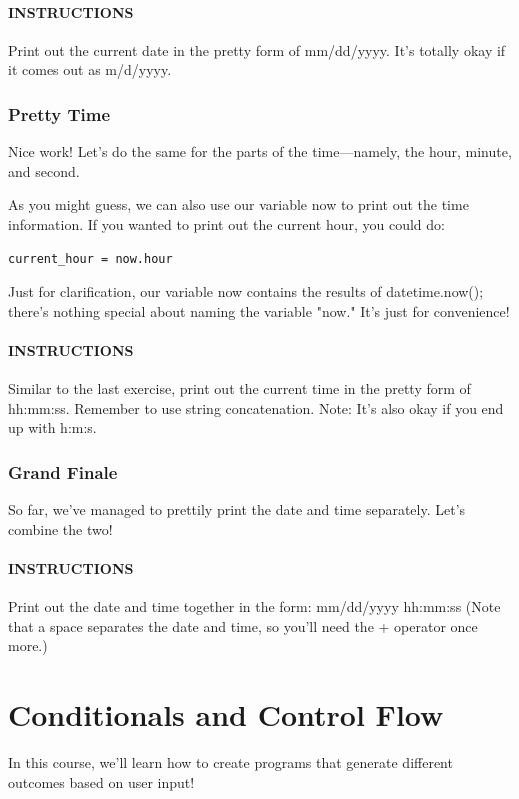 \documentclass[12pt,a4paper,final,twoside,onecolumn,titlepage]{book}
\begin{document}
\subsubsection{INSTRUCTIONS}
Print out the current date in the pretty form of mm/dd/yyyy. It's totally okay if it comes out as m/d/yyyy.

\subsection{Pretty Time}
Nice work! Let's do the same for the parts of the time—namely, the hour, minute, and second.

As you might guess, we can also use our variable now to print out the time information. If you wanted to print out the current hour, you could do:
\begin{lstlisting}
current_hour = now.hour
\end{lstlisting}
Just for clarification, our variable now contains the results of datetime.now(); there's nothing special about naming the variable "now." It's just for convenience!

\subsubsection{INSTRUCTIONS}
Similar to the last exercise, print out the current time in the pretty form of hh:mm:ss. Remember to use string concatenation.
Note: It's also okay if you end up with h:m:s.

\subsection{Grand Finale}
So far, we've managed to prettily print the date and time separately. Let's combine the two!

\subsubsection{INSTRUCTIONS}
Print out the date and time together in the form: mm/dd/yyyy hh:mm:ss
(Note that a space separates the date and time, so you'll need the + operator once more.)

\chapter{Conditionals and Control Flow}
In this course, we'll learn how to create programs that generate different outcomes based on user input!
\end{document}
